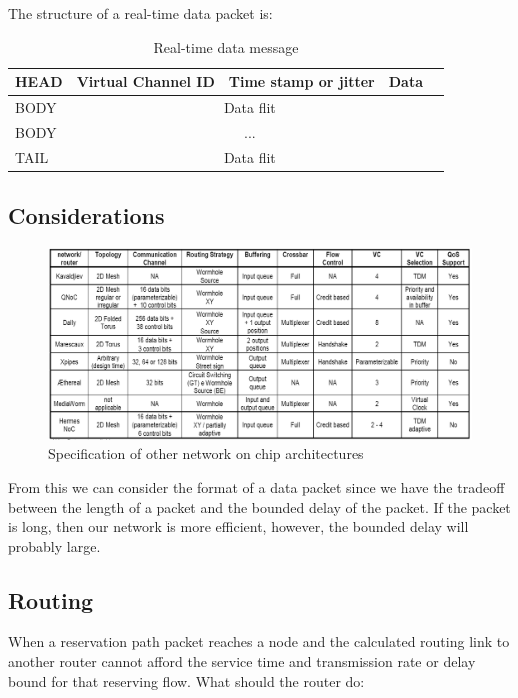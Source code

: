 \documentclass[a4]{article}
\begin{document}
The structure of a real-time data packet is:

\begin{table}[htbp]
\begin{center}
  \begin{tabular}{ | l | l | l | l | l |}
    \hline
	HEAD & Virtual Channel ID & Time stamp or jitter & Data \\ \hline 
	BODY & \multicolumn{3}{|c|}{Data flit} \\ \hline
	BODY &\multicolumn{3}{|c|}{...} \\ \hline
	TAIL & \multicolumn{3}{|c|}{Data flit} \\
    \hline
  \end{tabular}
\end{center}
\caption{Real-time data message}
\label{table:DataMsg}
\end{table}

\subsection{Considerations}

\begin{figure}[htp]
\centering
\includegraphics[width=15cm]{pics/OtherArcs.png}
\caption[Other Spec.]
{Specification of other network on chip architectures}\label{fig:otherSpec}
\end{figure}

From this we can consider the format of a data packet since we have the 
tradeoff between the length of a packet and the bounded delay of the packet. 
If the packet is long, then our network is more efficient, however, the bounded 
delay will probably large.
\subsection{Routing}
When a reservation path packet reaches a node and the calculated routing link 
to another router cannot afford the service time and transmission rate or delay 
bound for that reserving flow. What should the router do:
\end{document}
